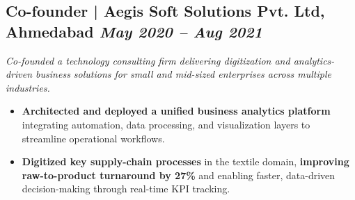 \documentclass[10pt,a4paper]{article}
\begin{document}
\subsection{Co-founder | Aegis Soft Solutions Pvt. Ltd, Ahmedabad \hfill
\textit{May 2020 -- Aug 2021}}
\textit{Co-founded a technology consulting firm delivering digitization and analytics-driven business solutions for small and mid-sized enterprises across multiple industries.}
\begin{itemize}
    \item \textbf{Architected and deployed a unified business analytics platform} integrating automation, data processing, and visualization layers to streamline operational workflows.
    \item \textbf{Digitized key supply-chain processes} in the textile domain, \textbf{improving raw-to-product turnaround by 27\%} and enabling faster, data-driven decision-making through real-time KPI tracking.
\end{itemize}


\end{document}
